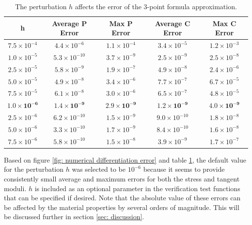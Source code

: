 \documentclass[]{spie}  %
\newcommand\Tstrut{\rule{0pt}{2.6ex}}         %
\begin{document}
\begin{table}[h]
	\centering
	\caption{The perturbation $h$ affects the error of the 3-point formula approximation.}
	\begin{tabular}{ | c | c | c | c | c | }
		\hline
		h & Average P Error & Max P Error & Average C Error & Max C Error \Tstrut \\ \hline
		$7.5 \times 10^{-4}$ & $4.4 \times 10^{-6}$  & $1.1 \times 10^{-4}$ & $3.4 \times 10^{-5}$ & $1.2 \times 10^{-3}$ \Tstrut \\
		$1.0 \times 10^{-5}$ & $5.3 \times 10^{-10}$ & $3.7 \times 10^{-9}$ & $2.5 \times 10^{-9}$ & $2.5 \times 10^{-8}$ \\
		$2.5 \times 10^{-5}$ & $5.8 \times 10^{-9}$  & $1.9 \times 10^{-7}$ & $4.9 \times 10^{-8}$ & $2.4 \times 10^{-6}$ \\
		$5.0 \times 10^{-5}$ & $4.9 \times 10^{-8}$  & $3.4 \times 10^{-6}$ & $7.7 \times 10^{-7}$ & $6.7 \times 10^{-5}$ \\
		$7.5 \times 10^{-5}$ & $6.1 \times 10^{-8}$  & $3.0 \times 10^{-6}$ & $6.5 \times 10^{-7}$ & $4.8 \times 10^{-5}$ \\
		$\bm{1.0 \times 10^{-6}}$ & $\bm{1.4 \times 10^{-9}}$  & $\bm{2.9 \times 10^{-9}}$ & $\bm{1.2 \times 10^{-9}}$ & $\bm{4.0 \times 10^{-9}}$ \\
		$2.5 \times 10^{-6}$ & $6.2 \times 10^{-10}$ & $1.5 \times 10^{-9}$ & $9.0 \times 10^{-10}$& $1.8 \times 10^{-8}$ \\
		$5.0 \times 10^{-6}$ & $3.3 \times 10^{-10}$ & $1.7 \times 10^{-9}$ & $8.4 \times 10^{-10}$& $1.6 \times 10^{-8}$ \\
		$7.5 \times 10^{-6}$ & $5.8 \times 10^{-10}$ & $1.5 \times 10^{-8}$ & $3.9 \times 10^{-9}$ & $1.7 \times 10^{-7}$ \\
		\hline
	\end{tabular}
\label{table: h vs. error}
\end{table}

Based on figure \ref{fig: numerical differentiation error} and table \ref{table: h vs. error}, the default value for the perturbation $h$ was selected to be $10^{-6}$ because it seems to provide consistently small average and maximum errors for both the stress and tangent moduli. $h$ is included as an optional parameter in the verification test functions that can be specified if desired. Note that the absolute value of these errors can be affected by the material properties by several orders of magnitude. This will be discussed further in section \ref{sec: discussion}.
\end{document}
